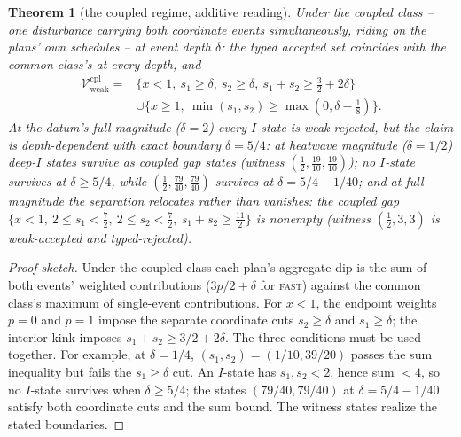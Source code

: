 \documentclass[preprint,11pt,authoryear]{elsarticle}
\newtheorem{theorem}{Theorem}
\theoremstyle{remark}
\newcommand{\Vweak}{\mathcal{V}_{\mathrm{weak}}}
\newcommand{\act}[1]{\textsc{#1}}
\begin{document}
\begin{theorem}[the coupled regime, additive reading]\label{thm:coupled}
Under the coupled class -- one disturbance carrying both coordinate events simultaneously, riding on the plans' own schedules -- at event depth $\delta$: the typed accepted set coincides with the common class's at every depth, and
\begin{align*}
\Vweak^{\mathrm{cpl}}={}&\{x<1,\ s_1\ge\delta,\ s_2\ge\delta,\ s_1+s_2\ge\tfrac32+2\delta\}\\
&\cup\{x\ge1,\ \min(s_1,s_2)\ge\max(0,\delta-\tfrac18)\}.
\end{align*}
At the datum's full magnitude ($\delta=2$) every $I$-state is weak-rejected, but the claim is depth-dependent with exact boundary $\delta=5/4$: at heatwave magnitude ($\delta=1/2$) deep-$I$ states survive as coupled gap states (witness $(\tfrac12,\tfrac{19}{10},\tfrac{19}{10})$); no $I$-state survives at $\delta\ge5/4$, while $(\tfrac12,\tfrac{79}{40},\tfrac{79}{40})$ survives at $\delta=5/4-1/40$; and at full magnitude the separation relocates rather than vanishes: the coupled gap $\{x<1,\ 2\le s_1<\tfrac72,\ 2\le s_2<\tfrac72,\ s_1+s_2\ge\tfrac{11}2\}$ is nonempty (witness $(\tfrac12,3,3)$ is weak-accepted and typed-rejected).
\end{theorem}
\begin{proof}[Proof sketch]
Under the coupled class each plan's aggregate dip is the sum of both events' weighted contributions ($3p/2+\delta$ for \act{fast}) against the common class's maximum of single-event contributions. For $x<1$, the endpoint weights $p=0$ and $p=1$ impose the separate coordinate cuts $s_2\ge\delta$ and $s_1\ge\delta$; the interior kink imposes $s_1+s_2\ge3/2+2\delta$. The three conditions must be used together. For example, at $\delta=1/4$, $(s_1,s_2)=(1/10,39/20)$ passes the sum inequality but fails the $s_1\ge\delta$ cut. An $I$-state has $s_1,s_2<2$, hence sum $<4$, so no $I$-state survives when $\delta\ge5/4$; the states $(79/40,79/40)$ at $\delta=5/4-1/40$ satisfy both coordinate cuts and the sum bound. The witness states realize the stated boundaries.
\end{proof}
\end{document}
